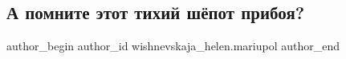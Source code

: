  
 
 
 
 

\subsection{А помните этот тихий шёпот прибоя?}
\label{sec:29_12_2022.fb.wishnevskaja_helen.mariupol.1.a_pomnite_etot_tikhi}

\ifcmt
 author_begin
   author_id wishnevskaja_helen.mariupol
 author_end
\fi
